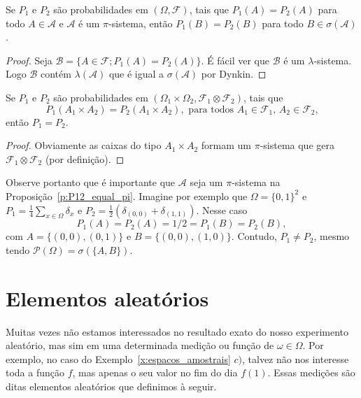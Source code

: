 \documentclass[../main/Notas_de_aula.tex]{subfiles}
\begin{document}
\begin{proposition}
  \label{p:P12_equal_pi}
  Se $P_1$ e $P_2$ são probabilidades em $(\Omega, \mathcal{F})$, tais que $P_1(A) = P_2(A)$ para todo $A \in \mathcal{A}$ e $\mathcal{A}$ é
  um $\pi$-sistema, então $P_1(B) = P_2(B)$ para todo $B \in \sigma(\mathcal{A})$.
\end{proposition}

\begin{proof}
  Seja $\mathcal{B} = \{A \in \mathcal{F}; P_1(A) = P_2(A)\}$.
  É fácil ver que $\mathcal{B}$ é um $\lambda$-sistema.
  Logo $\mathcal{B}$ contém $\lambda(\mathcal{A})$ que é igual a $\sigma(\mathcal{A})$ por Dynkin.
\end{proof}

\begin{corollary}
  \label{c:produto_e_unico}
  Se $P_1$ e $P_2$ são probabilidades em $(\Omega_1 \times \Omega_2, \mathcal{F}_1 \otimes \mathcal{F}_2)$, tais que
  \begin{equation}
    P_1(A_1 \times A_2) = P_2(A_1 \times A_2), \text{ para todos $A_1 \in \mathcal{F}_1$, $A_2 \in \mathcal{F}_2$,}
  \end{equation}
  então $P_1 = P_2$.
\end{corollary}

\begin{proof}
  Obviamente as caixas do tipo $A_1 \times A_2$ formam um $\pi$-sistema que gera $\mathcal{F}_1 \otimes \mathcal{F}_2$ (por definição).
\end{proof}

\begin{example}
  Observe portanto que é importante que $\mathcal{A}$ seja um $\pi$-sistema na Proposição~\ref{p:P12_equal_pi}.
  Imagine por exemplo que $\Omega = \{0,1\}^2$ e $P_1 = \tfrac 14 \sum_{x \in \Omega} \delta_x$ e $P_2 = \tfrac 12 (\delta_{(0,0)} + \delta_{(1,1)})$.
  Nesse caso
  \begin{equation}
    P_1(A) = P_2(A) = 1/2 = P_1(B) = P_2(B),
  \end{equation}
  com $A = \{(0,0), (0,1)\}$ e $B = \{(0,0), (1,0)\}$.
  Contudo, $P_1 \neq P_2$, mesmo tendo $\mathcal{P}(\Omega) = \sigma(\{A,B\})$.
\end{example}


\section{Elementos aleatórios}

Muitas vezes não estamos interessados no resultado exato do nosso experimento aleatório, mas sim em uma determinada medição ou função de $\omega \in \Omega$.
Por exemplo, no caso do Exemplo~\ref{x:espacos_amostrais} $c)$, talvez não nos interesse toda a função $f$, mas apenas o seu valor no fim do dia $f(1)$.
Essas medições são ditas elementos aleatórios que definimos à seguir.
\end{document}
